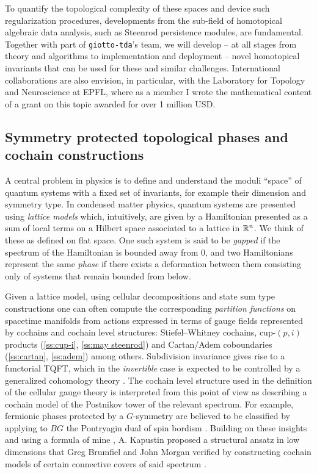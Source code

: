To quantify the topological complexity of these spaces and device such regularization procedures, developments from the sub-field of homotopical algebraic data analysis, such as Steenrod persistence modules, are fundamental.
Together with part of \texttt{giotto-tda}'s team, we will develop -- at all stages from theory and algorithms to implementation and deployment -- novel homotopical invariants that can be used for these and similar challenges.
International collaborations are also envision, in particular, with the Laboratory for Topology and Neuroscience at EPFL, where as a member I wrote the mathematical content of a grant on this topic awarded for over 1 million USD.

\subsection{Symmetry protected topological phases and cochain constructions} \label{ss:spt phases}

A central problem in physics is to define and understand the moduli ``space'' of quantum systems with a fixed set of invariants, for example their dimension and symmetry type.
In condensed matter physics, quantum systems are presented using \textit{lattice models} which, intuitively, are given by a Hamiltonian presented as a sum of local terms on a Hilbert space associated to a lattice in $\mathbb{R}^n$.
We think of these as defined on flat space.
One such system is said to be \textit{gapped} if the spectrum of the Hamiltonian is bounded away from $0$, and two Hamiltonians represent the same \textit{phase} if there exists a deformation between them consisting only of systems that remain bounded from below.

Given a lattice model, using cellular decompositions and state sum type constructions one can often compute the corresponding \textit{partition functions} on spacetime manifolds from actions expressed in terms of gauge fields represented by cochains and cochain level structures: Stiefel--Whitney cochains, cup-$(p, i)$ products (\cref{ss:cup-i}, \cref{ss:may steenrod}) and Cartan/Adem coboundaries (\cref{ss:cartan}, \cref{ss:adem}) among others.
Subdivision invariance gives rise to a functorial TQFT, which in the \textit{invertible} case is expected to be controlled by a generalized cohomology theory \cite{freed2021reflection}.
The cochain level structure used in the definition of the cellular gauge theory is interpreted from this point of view as describing a cochain model of the Postnikov tower of the relevant spectrum.
For example, fermionic phases protected by a $G$-symmetry are believed to be classified by applying to $BG$ the Pontryagin dual of spin bordism \cite{kapustin2015cobordism, kapustin2017fermionic}.
Building on these insights and using a formula of mine \cite{medina2020cartan}, A. Kapustin proposed a structural ansatz in low dimensions that Greg Brumfiel and John Morgan verified by constructing cochain models of certain connective covers of said spectrum \cite{brumfiel2016pontrjagin, brumfiel2018pontrjagin}.


